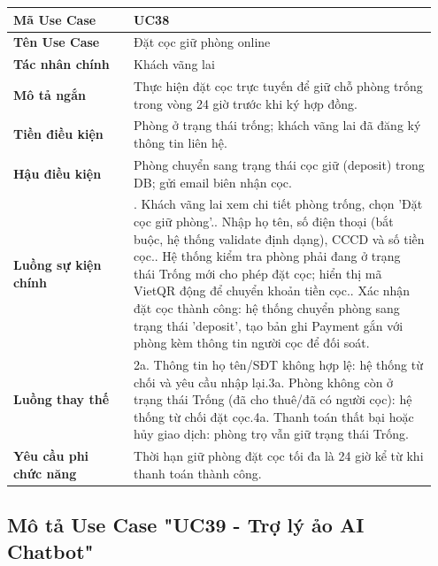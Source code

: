 \documentclass[a4paper,oneside]{report}
\begin{document}
\begin{longtable}[]{@{}>{\RaggedRight\arraybackslash}p{0.27\linewidth}>{\RaggedRight\arraybackslash}p{0.68\linewidth}@{}}
\toprule
\textbf{Mã Use Case} & UC38\tabularnewline
\midrule
\endhead
\textbf{Tên Use Case} & Đặt cọc giữ phòng online\tabularnewline
\textbf{Tác nhân chính} & Khách vãng lai\tabularnewline
\textbf{Mô tả ngắn} & Thực hiện đặt cọc trực tuyến để giữ chỗ phòng
trống trong vòng 24 giờ trước khi ký hợp đồng.\tabularnewline
\textbf{Tiền điều kiện} & Phòng ở trạng thái trống; khách vãng lai đã
đăng ký thông tin liên hệ.\tabularnewline
\textbf{Hậu điều kiện} & Phòng chuyển sang trạng thái cọc giữ (deposit)
trong DB; gửi email biên nhận cọc.\tabularnewline
\textbf{Luồng sự kiện chính} & 1. Khách vãng lai xem
chi tiết phòng trống, chọn 'Đặt cọc giữ phòng'.\newline 2. Nhập họ
tên, số điện thoại (bắt buộc, hệ thống validate định dạng), CCCD và số
tiền cọc.\newline 3. Hệ thống kiểm tra phòng phải đang ở trạng thái
Trống mới cho phép đặt cọc; hiển thị mã VietQR động để chuyển khoản tiền
cọc.\newline 4. Xác nhận đặt cọc thành công: hệ thống chuyển phòng
sang trạng thái 'deposit', tạo bản ghi Payment gắn với phòng kèm thông
tin người cọc để đối soát.\tabularnewline
\textbf{Luồng thay thế} & 2a. Thông tin họ tên/SĐT
không hợp lệ: hệ thống từ chối và yêu cầu nhập lại.\newline 3a.
Phòng không còn ở trạng thái Trống (đã cho thuê/đã có người cọc): hệ
thống từ chối đặt cọc.\newline 4a. Thanh toán thất bại hoặc hủy
giao dịch: phòng trọ vẫn giữ trạng thái Trống.\tabularnewline
\textbf{Yêu cầu phi chức năng} & Thời hạn giữ phòng đặt cọc tối đa là 24
giờ kể từ khi thanh toán thành công.\tabularnewline
\bottomrule
\end{longtable}

\subsection{Mô tả Use Case "UC39 - Trợ lý ảo AI Chatbot"}
\end{document}
